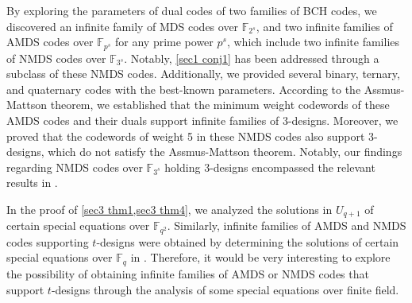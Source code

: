 \documentclass[sn-mathphys-num]{sn-jnl}%
\theoremstyle{thmstyleone}%
\theoremstyle{thmstyletwo}%
\theoremstyle{thmstylethree}%
\begin{document}
By exploring the parameters of dual codes of two families of BCH codes, we discovered an infinite family of MDS codes over $\mathbb{F}_{2^s}$, and two infinite families of AMDS codes over $\mathbb{F}_{p^s}$ for any prime power $p^s$, which include two infinite families of NMDS codes over $\mathbb{F}_{3^s}$. Notably, \cref{sec1 conj1} has been addressed through a subclass of these NMDS codes. Additionally, we provided several binary, ternary, and quaternary codes with the best-known parameters. According to the Assmus-Mattson theorem, we established that the minimum weight codewords of these AMDS codes and their duals support infinite families of $3$-designs. Moreover, we proved that the codewords of weight 5 in these NMDS codes also support 3-designs, which do not satisfy the Assmus-Mattson theorem. Notably, our findings regarding NMDS codes over \(\mathbb{F}_{3^s}\) holding $3$-designs encompassed the relevant results in \cite[Theorem 21]{Ding2020InfiniteFamiliesMDS}. 

In the proof of \cref{sec3 thm1,sec3 thm4}, we analyzed the solutions in $U_{q+1}$ of certain special equations over $\mathbb{F}_{q^2}$. Similarly, infinite families of AMDS and NMDS codes supporting $t$-designs were obtained by determining the solutions of certain special equations over $\mathbb{F}_q$ in \cite{Xu2022InfiniteFamiliedDesigns,Heng2023NewInfiniteFamilies}. Therefore, it would be very interesting to explore the possibility of obtaining infinite families of AMDS or NMDS codes that support $t$-designs through the analysis of some special equations over finite field.

%
%
%
%
%



\end{document}
